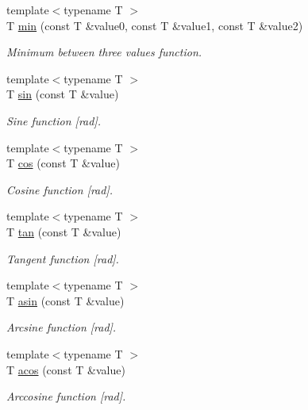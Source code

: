 \begin{DoxyCompactItemize}
{\footnotesize template$<$typename T $>$ }\\T \hyperlink{namespaceddd_a563d604cd5ed6ee708fffa32cbe6ccf2}{min} (const T \&value0, const T \&value1, const T \&value2)
\begin{DoxyCompactList}\small\item\em Minimum between three values function. \end{DoxyCompactList}\item 
{\footnotesize template$<$typename T $>$ }\\T \hyperlink{namespaceddd_a3c2355d52318b82d63a4ff3525bb651a}{sin} (const T \&value)
\begin{DoxyCompactList}\small\item\em Sine function \mbox{[}rad\mbox{]}. \end{DoxyCompactList}\item 
{\footnotesize template$<$typename T $>$ }\\T \hyperlink{namespaceddd_a6a7f708bb835a257f25e87110af27b6a}{cos} (const T \&value)
\begin{DoxyCompactList}\small\item\em Cosine function \mbox{[}rad\mbox{]}. \end{DoxyCompactList}\item 
{\footnotesize template$<$typename T $>$ }\\T \hyperlink{namespaceddd_aeb0ca0d620545cbb5ef955eed88d1c0d}{tan} (const T \&value)
\begin{DoxyCompactList}\small\item\em Tangent function \mbox{[}rad\mbox{]}. \end{DoxyCompactList}\item 
{\footnotesize template$<$typename T $>$ }\\T \hyperlink{namespaceddd_af887d6f09da2128f99b36b034ab2ed1f}{asin} (const T \&value)
\begin{DoxyCompactList}\small\item\em Arcsine function \mbox{[}rad\mbox{]}. \end{DoxyCompactList}\item 
{\footnotesize template$<$typename T $>$ }\\T \hyperlink{namespaceddd_a03e440b351f44fec5abac1270231e3bb}{acos} (const T \&value)
\begin{DoxyCompactList}\small\item\em Arccosine function \mbox{[}rad\mbox{]}. \end{DoxyCompactList}\item 

\end{DoxyCompactItemize}
